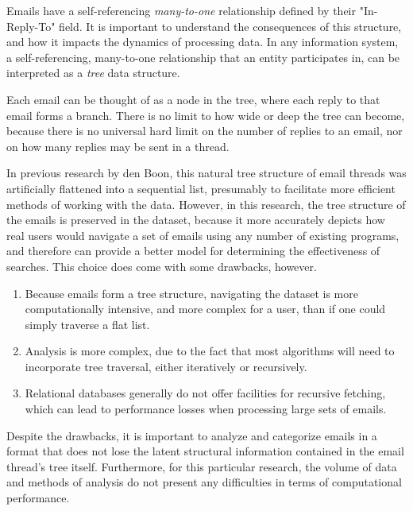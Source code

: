 \documentclass[a4paper, 12pt]{article}
\begin{document}
			Emails have a self-referencing \textit{many-to-one} relationship defined by their "In-Reply-To" field. It is important to understand the consequences of this structure, and how it impacts the dynamics of processing data. In any information system, a self-referencing, many-to-one relationship that an entity participates in, can be interpreted as a \textit{tree} data structure.
			
			Each email can be thought of as a node in the tree, where each reply to that email forms a branch. There is no limit to how wide or deep the tree can become, because there is no universal hard limit on the number of replies to an email, nor on how many replies may be sent in a thread.
			
			In previous research by den Boon, this natural tree structure of email threads was artificially flattened into a sequential list, presumably to facilitate more efficient methods of working with the data\cite{denboon}. However, in this research, the tree structure of the emails is preserved in the dataset, because it more accurately depicts how real users would navigate a set of emails using any number of existing programs, and therefore can provide a better model for determining the effectiveness of searches. This choice does come with some drawbacks, however.
			
			\begin{enumerate}
				\item Because emails form a tree structure, navigating the dataset is more computationally intensive, and more complex for a user, than if one could simply traverse a flat list.
				\item Analysis is more complex, due to the fact that most algorithms will need to incorporate tree traversal, either iteratively or recursively.
				\item Relational databases generally do not offer facilities for recursive fetching, which can lead to performance losses when processing large sets of emails.
			\end{enumerate}
			
			Despite the drawbacks, it is important to analyze and categorize emails in a format that does not lose the latent structural information contained in the email thread's tree itself. Furthermore, for this particular research, the volume of data and methods of analysis do not present any difficulties in terms of computational performance.
		
\end{document}
